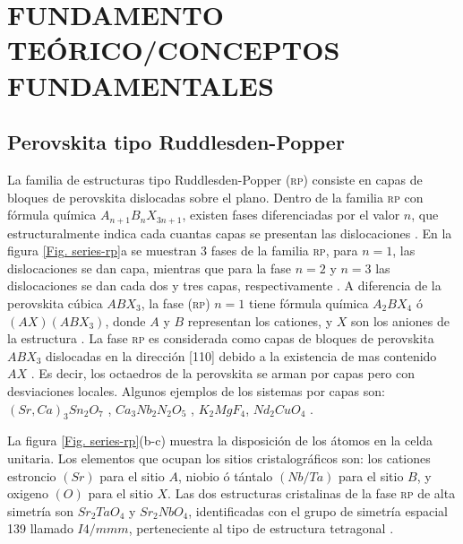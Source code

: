 
\chapter{FUNDAMENTO TEÓRICO/CONCEPTOS FUNDAMENTALES}
\section{Perovskita tipo Ruddlesden-Popper}

La familia de estructuras tipo Ruddlesden-Popper (\textsc{rp}) consiste en capas de bloques de perovskita dislocadas sobre el plano. Dentro de la familia \textsc{rp} con fórmula química $A_{n+1}B_{n}X_{3n+1}$, existen fases diferenciadas por el valor $n$, que estructuralmente indica cada cuantas capas se presentan las dislocaciones \cite{Tobias2004}. En la figura \ref{Fig. series-rp}a se muestran 3 fases de la familia \textsc{rp}, para $n=1$, las dislocaciones se dan capa, mientras que para la fase $n=2$ y $n=3$ las dislocaciones se dan cada dos y tres capas, respectivamente \cite{Fuertes2012ChemistryPerovskites}.
A diferencia de la perovskita cúbica $ABX_{3}$, la fase (\textsc{rp}) $n=1$ tiene fórmula química $A_{2}BX_{4}$ ó $(AX)(ABX_{3})$, donde $A$ y $B$ representan los cationes, y $X$ son los aniones de la estructura \cite{Beznosikov2000}. La fase \textsc{rp} es considerada como capas de bloques de perovskita $ABX_{3}$ dislocadas en la dirección [110] debido a la existencia de mas contenido $AX$ \cite{Suemoto2018IntergrowthSr2TaO3N}. Es decir, los octaedros de la perovskita se arman por capas pero con desviaciones locales. Algunos ejemplos de los sistemas por capas son: $(Sr,Ca)_{3}Sn_{2}O_{7}$ \cite{Yoshida2018HybridPhases}, $Ca_{3}Nb_{2}N_{2}O_{5}$ \cite{Gou2020Photocatalysis}, $K_{2}MgF_{4}$, $Nd_{2}CuO_{4}$ \cite{Beznosikov2000}.

La figura \ref{Fig. series-rp}(b-c) muestra la disposición de los átomos en la celda unitaria. Los elementos que ocupan los sitios cristalográficos son: los cationes estroncio $(Sr)$ para el sitio $A$, niobio ó tántalo $(Nb/Ta)$ para el sitio $B$, y oxigeno $(O)$ para el sitio $X$. Las dos estructuras cristalinas de la fase \textsc{rp} de alta simetría son $Sr_{2}TaO_{4}$ y $Sr_{2}NbO_{4}$, identificadas con el grupo de simetría espacial 139 llamado $I4/mmm$, perteneciente al tipo de estructura tetragonal \cite{Clarke2002}.


